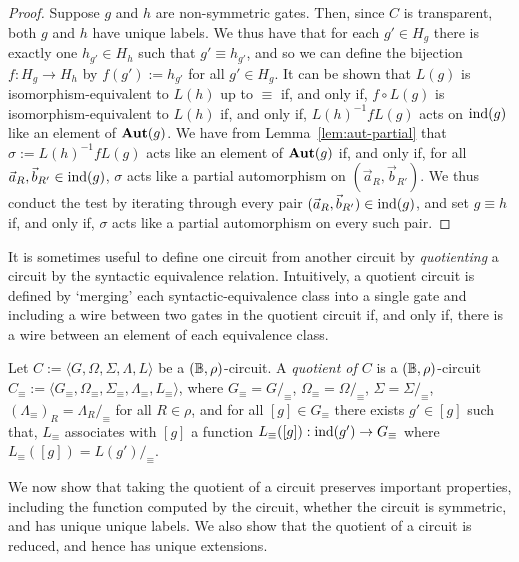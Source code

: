 \documentclass[../paper.tex]{subfiles}
\begin{document}
\begin{proof}
  Suppose $g$ and $h$ are non-symmetric gates. Then, since $C$ is transparent,
  both $g$ and $h$ have unique labels. We thus have that for each $g' \in H_g$
  there is exactly one $h_{g'} \in H_h$ such that $g' \equiv h_{g'}$, and so we
  can define the bijection $f : H_g \rightarrow H_h$ by $f(g') := h_{g'}$ for
  all $g' \in H_g$. It can be shown that $L(g)$ is isomorphism-equivalent to
  $L(h)$ up to $\equiv$ if, and only if, $f \circ L(g)$ is
  isomorphism-equivalent to $L(h)$ if, and only if, $L(h)^{-1} f L(g)$ acts on
  $\text{\upshape ind} (g)$ like an element of $\text{\textbf{Aut}}(g)$. We have from
  Lemma~\ref{lem:aut-partial} that $\sigma := L(h)^{-1} f L(g)$ acts like an
  element of $\text{\textbf{Aut}}(g)$ if, and only if, for all $\vec{a}_R, \vec{b}_{R'} \in
  \text{\upshape ind}(g)$, $\sigma$ acts like a partial automorphism on $(\vec{a}_R,
  \vec{b}_{R'})$. We thus conduct the test by iterating through every pair
  $(\vec{a}_R, \vec{b}_{R'}) \in \text{\upshape ind}(g)$, and set $g \equiv h$ if, and only if,
  $\sigma$ acts like a partial automorphism on every such pair.
\end{proof}

It is sometimes useful to define one circuit from another circuit by
\emph{quotienting} a circuit by the syntactic equivalence relation. Intuitively,
a quotient circuit is defined by `merging' each syntactic-equivalence class into
a single gate and including a wire between two gates in the quotient circuit if,
and only if, there is a wire between an element of each equivalence class.

\begin{definition}
  Let $C := \langle G, \Omega, \Sigma, \Lambda, L \rangle$ be a $(\mathbb{B},
  \rho)$-circuit. A \emph{quotient of $C$} is a $(\mathbb{B}, \rho)$-circuit $C_\equiv
  := \langle G_\equiv , \Omega_\equiv, \Sigma_\equiv , \Lambda_\equiv, L_\equiv
  \rangle$, where $G_\equiv = G /_\equiv$, $\Omega_\equiv = \Omega /_\equiv$,
  $\Sigma = \Sigma /_\equiv$, $(\Lambda_\equiv)_R = \Lambda_R /_\equiv$ for all
  $R \in \rho$, and for all $[g] \in G_\equiv$ there exists $g' \in [g]$ such
  that, $L_\equiv$ associates with $[g]$ a function $L_\equiv([g]) : \text{\upshape ind}(g')
  \rightarrow G_\equiv$ where $L_\equiv([g]) = L(g')/_\equiv$.
\end{definition}

We now show that taking the quotient of a circuit preserves important
properties, including the function computed by the circuit, whether the circuit
is symmetric, and has unique unique labels. We also show that the quotient of a
circuit is reduced, and hence has unique extensions.
\end{document}

